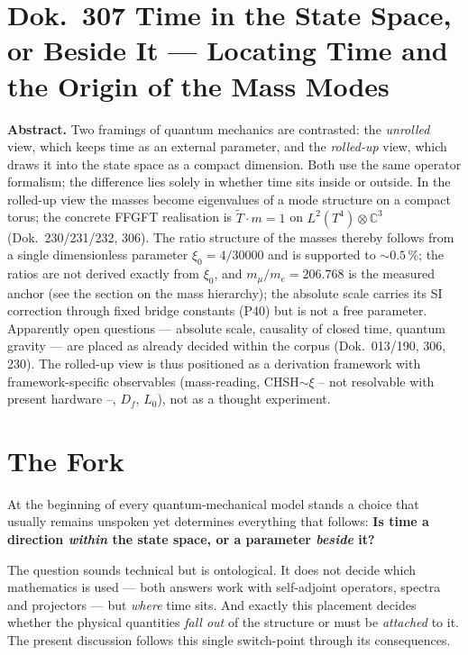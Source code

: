 \section*{Dok.~307 \quad Time in the State Space, or Beside It --- Locating Time and the Origin of the Mass Modes}

\begingroup\small\noindent
\textbf{Abstract.} Two framings of quantum mechanics are contrasted: the \emph{unrolled} view, which keeps time as an external parameter, and the \emph{rolled-up} view, which draws it into the state space as a compact dimension. Both use the same operator formalism; the difference lies solely in whether time sits inside or outside. In the rolled-up view the masses become eigenvalues of a mode structure on a compact torus; the concrete FFGFT realisation is $\tilde T\cdot m = 1$ on $L^2(T^4)\otimes\mathbb{C}^3$ (Dok.~230/231/232, 306). The ratio structure of the masses thereby follows from a single dimensionless parameter $\xi_0 = 4/30000$ and is supported to ${\sim}0.5\,\%$; the ratios are not derived exactly from $\xi_0$, and $m_\mu/m_e = 206.768$ is the measured anchor (see the section on the mass hierarchy); the absolute scale carries its SI correction through fixed bridge constants (P40) but is not a free parameter. Apparently open questions --- absolute scale, causality of closed time, quantum gravity --- are placed as already decided within the corpus (Dok.~013/190, 306, 230). The rolled-up view is thus positioned as a derivation framework with framework-specific observables (mass-reading, CHSH$\sim\xi$ -- not resolvable with present hardware --, $D_f$, $L_0$), not as a thought experiment.
\par\endgroup

\medskip

\section{The Fork}

At the beginning of every quantum-mechanical model stands a choice that usually remains unspoken yet determines everything that follows: \textbf{Is time a direction \emph{within} the state space, or a parameter \emph{beside} it?}

The question sounds technical but is ontological. It does not decide which mathematics is used --- both answers work with self-adjoint operators, spectra and projectors --- but \emph{where} time sits. And exactly this placement decides whether the physical quantities \emph{fall out} of the structure or must be \emph{attached} to it. The present discussion follows this single switch-point through its consequences.

